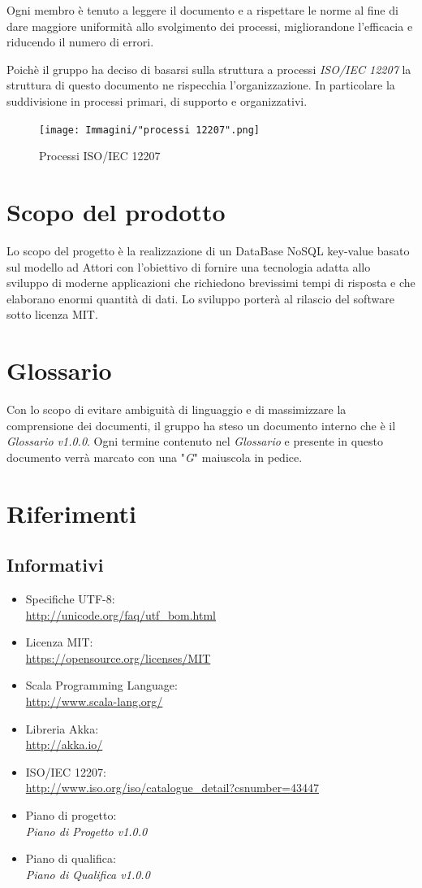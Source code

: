 \documentclass[a4paper]{report}
\begin{document}
			Ogni membro è tenuto a leggere il documento e a rispettare le norme al fine di dare maggiore uniformità allo svolgimento dei processi, 
			migliorandone l'efficacia e riducendo il numero di errori.
			
			Poichè il gruppo ha deciso di basarsi sulla struttura a processi \emph{ISO/IEC 12207} la struttura di questo documento ne rispecchia 
			l'organizzazione. In particolare la suddivisione in processi primari, di supporto e organizzativi.
			\begin{figure}[h!]
				\centering
				\texttt{[image: Immagini/"processi 12207".png]}
				\caption{Processi ISO/IEC 12207}
			\end{figure}
		\section{Scopo del prodotto}
			Lo scopo del progetto è la realizzazione di un DataBase NoSQL key-value basato sul modello ad Attori con l'obiettivo di fornire una 
			tecnologia adatta allo sviluppo di moderne applicazioni che richiedono brevissimi tempi di risposta e che elaborano enormi quantità 
			di dati. Lo sviluppo porterà al rilascio del software sotto licenza MIT.
		\section{Glossario}
			Con lo scopo di evitare ambiguità di linguaggio e di massimizzare la comprensione dei documenti, il gruppo ha steso un documento 
			interno che è il \emph{Glossario v1.0.0}. Ogni termine contenuto nel \emph{Glossario} e presente in questo documento verrà marcato 
			con una "\textit{G}" maiuscola in pedice.
		\section{Riferimenti}
			\subsection{Informativi}
				\begin{itemize}
					\item Specifiche UTF-8: \\ \url{http://unicode.org/faq/utf_bom.html}
					\item Licenza MIT: \\ \url{https://opensource.org/licenses/MIT}
					\item Scala Programming Language: \\ \url{http://www.scala-lang.org/}
					\item Libreria Akka: \\ \url{http://akka.io/}
					\item ISO/IEC 12207: \\ \url{http://www.iso.org/iso/catalogue_detail?csnumber=43447}
					\item Piano di progetto: \\ \emph{Piano di Progetto v1.0.0}
					\item Piano di qualifica: \\ \emph{Piano di Qualifica v1.0.0}
				\end{itemize}
\end{document}
